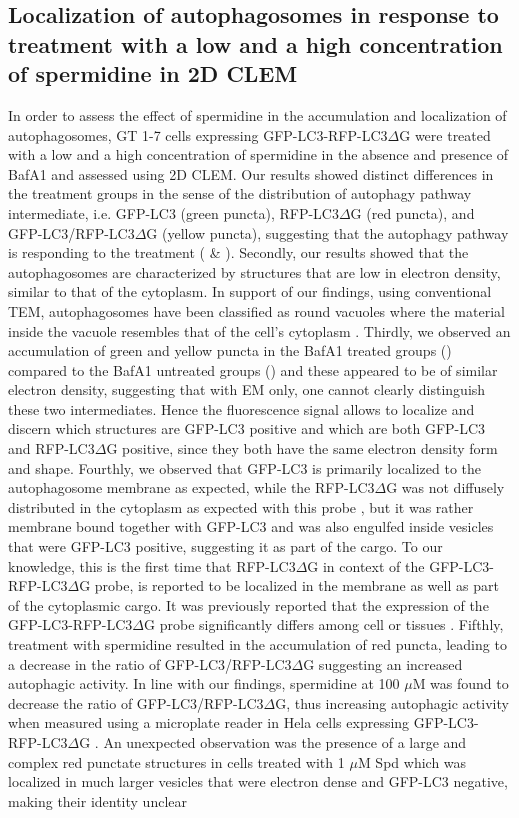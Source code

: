 \subsection{Localization of autophagosomes in response to treatment with a low and a high concentration of spermidine in 2D CLEM}
In order to assess the effect of spermidine in the accumulation and localization of  autophagosomes, GT 1-7 cells expressing GFP-LC3-RFP-LC3$\Delta$G were treated with a low and a high concentration of spermidine in the absence and presence of BafA1 and assessed using 2D CLEM. Our results showed distinct differences in the treatment groups in the sense of the distribution of autophagy pathway intermediate, i.e. GFP-LC3 (green puncta), RFP-LC3$\Delta$G (red puncta), and GFP-LC3/RFP-LC3$\Delta$G (yellow puncta), suggesting that the autophagy pathway is responding to the treatment ( \& ). Secondly, our results showed that the autophagosomes are characterized by structures that are low in electron density, similar to that of the cytoplasm. In support of our findings, using conventional TEM, autophagosomes have been classified as round vacuoles where the material inside the vacuole resembles that of the cell’s cytoplasm \citep{Eskelinen2008}. Thirdly, we observed an accumulation of green and yellow puncta in the BafA1 treated groups () compared to the BafA1 untreated groups () and these appeared to be of similar electron density, suggesting that with EM only, one cannot clearly distinguish these two intermediates. Hence the fluorescence signal allows to localize and discern which structures are GFP-LC3 positive and which are both GFP-LC3 and RFP-LC3$\Delta$G positive, since they both have the same electron density form and shape. Fourthly, we observed that GFP-LC3 is primarily localized to the autophagosome membrane as expected, while the RFP-LC3$\Delta$G was not diffusely distributed in the cytoplasm as expected with this probe \citep{Kaizuka2016}, but it was rather membrane bound together with GFP-LC3 and was also engulfed inside vesicles that were GFP-LC3 positive, suggesting it as part of the cargo. To our knowledge, this is the first time that RFP-LC3$\Delta$G in context of the GFP-LC3-RFP-LC3$\Delta$G probe, is reported to be localized in the membrane as well as part of the cytoplasmic cargo. It was previously reported that the expression of the GFP-LC3-RFP-LC3$\Delta$G probe significantly differs among cell or tissues \citep{MoulisandVindis2017}. Fifthly, treatment with spermidine resulted in the accumulation of red puncta, leading to a decrease in the ratio of GFP-LC3/RFP-LC3$\Delta$G suggesting an increased autophagic activity. In line with our findings, spermidine at 100 $\mu$M was found to decrease the ratio of GFP-LC3/RFP-LC3$\Delta$G, thus increasing autophagic activity when measured using a microplate reader in Hela cells expressing GFP-LC3-RFP-LC3$\Delta$G \citep{Kaizuka2016}. An unexpected observation was the presence of a large and complex red punctate structures in cells treated with 1 $\mu$M Spd which was localized in much larger vesicles that were electron dense and GFP-LC3 negative, making their identity unclear 